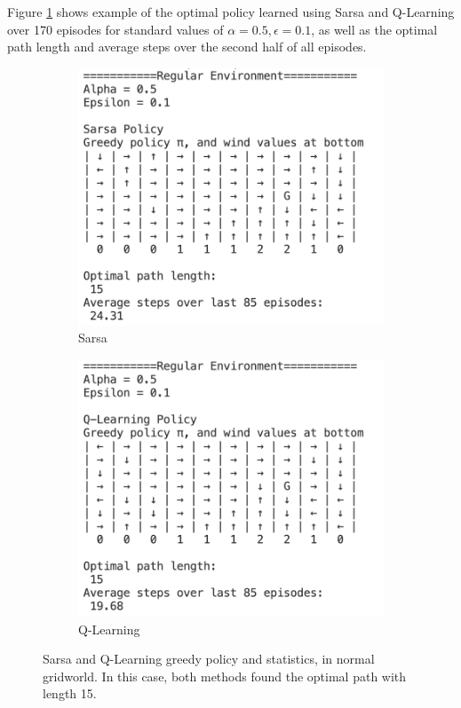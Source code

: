 \documentclass{article}
\begin{document}
Figure \ref{fig:regular_example} shows example of the optimal policy learned using Sarsa and Q-Learning over 170 episodes for standard values of $\alpha = 0.5, \epsilon = 0.1$, as well as the optimal path length and average steps over the second half of all episodes. 


\begin{figure}[h!]
  \centering
  \begin{subfigure}{0.45\textwidth} 
    \includegraphics[width=\textwidth]{sarsa_regular_example.png}
    \caption{Sarsa}
  \end{subfigure}
  \hspace{0.05\textwidth}  
  \begin{subfigure}{0.45\textwidth}  
    \includegraphics[width=\textwidth]{q_regular_example.png}
    \caption{Q-Learning}
  \end{subfigure}
  \caption{Sarsa and Q-Learning greedy policy and statistics, in normal gridworld. In this case, both methods found the optimal path with length 15.}
  \label{fig:regular_example}
\end{figure}
\end{document}
